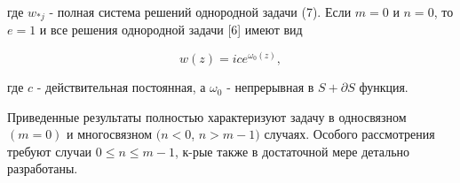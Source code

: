 \documentclass[10pt]{article}
\begin{document}
где $w_{* j}$ - полная система решений однородной задачи (7). Если $m=0$ и $n=0$, то $e=1$ и все решения однородной задачи [6] имеют вид



\[

w(z)=i c e^{\omega_{0}(z)},

\]



где $c$ - действительная постоянная, а $\omega_{0}$ - непрерывная в $S+\partial S$ функция.



Приведенные результаты полностью характеризуют задачу в односвязном $(m=0)$ и многосвязном $(n<0$, $n>m-1)$ случаях. Особого рассмотрения требуют случаи $0 \leqslant n \leqslant m-1$, к-рые также в достаточной мере детально разработаны.
\end{document}
